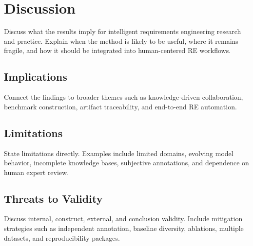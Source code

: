 \section{Discussion}

Discuss what the results imply for intelligent requirements engineering research and practice. Explain when the method is likely to be useful, where it remains fragile, and how it should be integrated into human-centered RE workflows.

\subsection{Implications}

Connect the findings to broader themes such as knowledge-driven collaboration, benchmark construction, artifact traceability, and end-to-end RE automation.

\subsection{Limitations}

State limitations directly. Examples include limited domains, evolving model behavior, incomplete knowledge bases, subjective annotations, and dependence on human expert review.

\subsection{Threats to Validity}

Discuss internal, construct, external, and conclusion validity. Include mitigation strategies such as independent annotation, baseline diversity, ablations, multiple datasets, and reproducibility packages.

